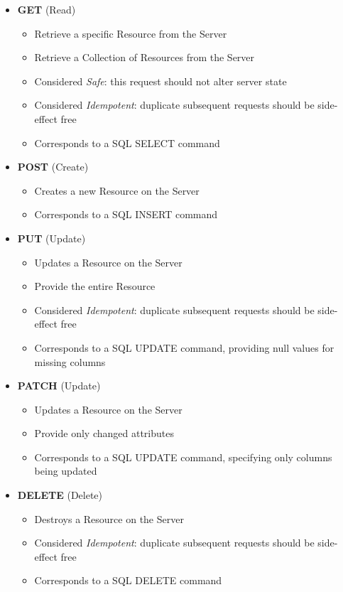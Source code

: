 \documentclass{book}
\begin{document}
\begin{itemize}
\item \textbf{GET} (Read)
    \begin{itemize}
    \item Retrieve a specific Resource from the Server
    \item Retrieve a Collection of Resources from the Server
    \item Considered \emph{Safe}: this request should not alter server state
    \item Considered \emph{Idempotent}: duplicate subsequent requests should be side-effect free
    \item Corresponds to a SQL SELECT command
    \end{itemize}
\item \textbf{POST} (Create)
    \begin{itemize}
    \item Creates a new Resource on the Server
    \item Corresponds to a SQL INSERT command
    \end{itemize}
\item \textbf{PUT} (Update)
    \begin{itemize}
    \item Updates a Resource on the Server
    \item Provide the entire Resource
    \item Considered \emph{Idempotent}: duplicate subsequent requests should be side-effect free
    \item Corresponds to a SQL UPDATE command, providing null values for missing columns
    \end{itemize}
\item \textbf{PATCH} (Update)
    \begin{itemize}
    \item Updates a Resource on the Server
    \item Provide only changed attributes
    \item Corresponds to a SQL UPDATE command, specifying only columns being updated
    \end{itemize}
\item \textbf{DELETE} (Delete)
    \begin{itemize}
    \item Destroys a Resource on the Server
    \item Considered \emph{Idempotent}: duplicate subsequent requests should be side-effect free
    \item Corresponds to a SQL DELETE command
    \end{itemize}
\end{itemize}
\end{document}
